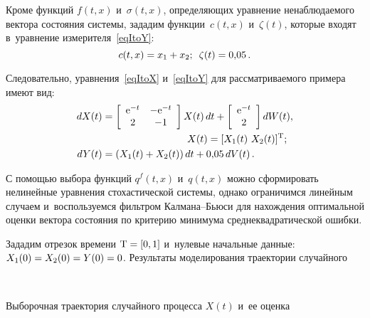 \begin{multicols}{2}
Кроме функций $f(t,x)$ и~$\sigma(t,x)$, определяющих уравнение
 ненаблюдаемого вектора состояния сис\-те\-мы, зададим функции~$c(t,x)$ и~$\zeta(t)$, 
 которые входят в~уравнение измерителя~\eqref{eqItoY}:
$$
  c(t,x) = x_1 + x_2; \enskip \zeta(t) = 0{,}05\,.
$$

Следовательно, уравнения~\eqref{eqItoX} и~\eqref{eqItoY} 
для рас\-смат\-ри\-ва\-емо\-го примера имеют вид:
\begin{align*}
  dX(t) &= \left[ \begin{array}{cc}
    \mathrm{e}^{-t} & -\mathrm{e}^{-t} \\
    2 & -1 \\
  \end{array} \right] X(t) \, dt +
  \left[ \begin{array}{c}
    \mathrm{e}^{-t} \\
    2 \\
  \end{array} \right] dW(t), \\
 & \hspace*{30mm}X(t) = [  X_1(t) \  X_2(t) ]^\trans;
\\
  dY(t) &= \left( X_1(t) + X_2(t) \right) dt + 0{,}05\, dV(t)\,.
\end{align*}

 

С помощью выбора функций $q^f(t,x)$ и~$q(t,x)$ можно сформировать 
нелинейные уравнения стохастической системы, однако ограничимся линейным 
случаем и~воспользуемся фильтром Кал\-ма\-на--Бью\-си для нахождения 
оптимальной оценки вектора состояния по критерию минимума среднеквадратической ошибки.

Зададим отрезок времени $\mathrm{T} \hm= [0,1]$ и~нулевые начальные данные: 
$X_1(0) \hm= X_2(0) \hm= Y(0) \hm= 0$.
Результаты моделирования траектории 
случайного\linebreak\vspace*{-12pt}


{ \begin{center}  %
 \vspace*{-3pt}
  \mbox{%
 \epsfxsize=79mm 
 }


\end{center}


\noindent
{\small{Выборочная траектория случайного процесса $X(t)$ и~ее оценка}}
}

\vspace*{9pt}

\addtocounter{figure}{1}


\end{multicols}
